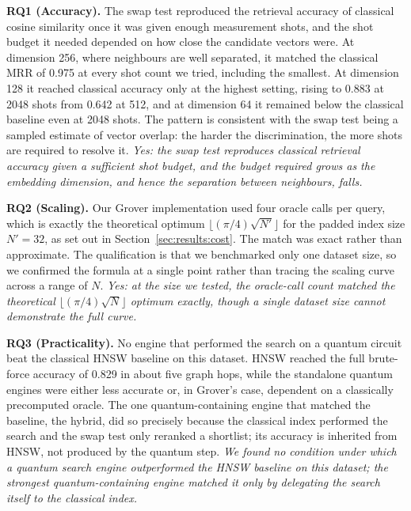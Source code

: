 \textbf{RQ1 (Accuracy).} The swap test reproduced the retrieval accuracy of
classical cosine similarity once it was given enough measurement shots, and the
shot budget it needed depended on how close the candidate vectors were. At
dimension 256, where neighbours are well separated, it matched the classical MRR
of 0.975 at every shot count we tried, including the smallest. At dimension 128
it reached classical accuracy only at the highest setting, rising to 0.883 at
2048 shots from 0.642 at 512, and at dimension 64 it remained below the classical
baseline even at 2048 shots. The pattern is consistent with the swap test being a
sampled estimate of vector overlap: the harder the discrimination, the more shots
are required to resolve it. \emph{Yes: the swap test reproduces classical
retrieval accuracy given a sufficient shot budget, and the budget required grows
as the embedding dimension, and hence the separation between neighbours, falls.}

\textbf{RQ2 (Scaling).} Our Grover implementation used four oracle calls per
query, which is exactly the theoretical optimum $\lfloor (\pi/4)\sqrt{N'}
\rfloor$ for the padded index size $N' = 32$, as set out in
Section~\ref{sec:results:cost}. The match was exact rather than approximate.
The qualification is that we benchmarked only one dataset size, so we confirmed
the formula at a single point rather than tracing the scaling curve across a
range of $N$. \emph{Yes: at the size we tested, the oracle-call count matched the
theoretical $\lfloor (\pi/4)\sqrt{N} \rfloor$ optimum exactly, though a single
dataset size cannot demonstrate the full curve.}

\textbf{RQ3 (Practicality).} No engine that performed the search on a quantum
circuit beat the classical HNSW baseline on this dataset. HNSW reached the full
brute-force accuracy of 0.829 in about five graph hops, while the standalone
quantum engines were either less accurate or, in Grover's case, dependent on a
classically precomputed oracle. The one quantum-containing engine that matched
the baseline, the hybrid, did so precisely because the classical index performed
the search and the swap test only reranked a shortlist; its accuracy is inherited
from HNSW, not produced by the quantum step. \emph{We found no condition under
which a quantum search engine outperformed the HNSW baseline on this dataset; the
strongest quantum-containing engine matched it only by delegating the search
itself to the classical index.}

